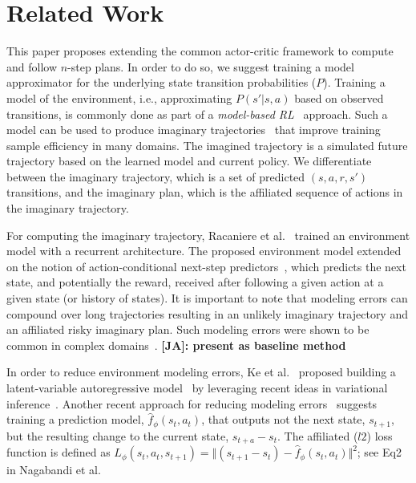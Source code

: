 \documentclass[letterpaper]{article} %
\newcommand{\JA}[1] {{\color{red} \textbf{[JA]: #1}}}
\begin{document}
\section{Related Work}

This paper proposes extending the common actor-critic framework to compute and follow $n$-step plans. In order to do so, we suggest training a model approximator for the underlying state transition probabilities ($P$).   
Training a model of the environment, i.e., approximating $P(s'|s,a)$ based on observed transitions, is commonly done as part of a \textit{model-based RL}~\cite{kaiser2019model,xu2020prediction} approach. Such a model can be used to produce imaginary trajectories~\cite{racaniere2017imagination} that improve training sample efficiency in many domains. The imagined trajectory is a simulated future trajectory based on the learned model and current policy. We differentiate between the imaginary trajectory, which is a set of predicted $(s,a,r,s')$ transitions, and the imaginary plan, which is the affiliated sequence of actions in the imaginary trajectory. 

For computing the imaginary trajectory, Racaniere et al.~\citeyear{racaniere2017imagination} trained an environment model with a recurrent architecture. The proposed environment model extended on the notion of action-conditional next-step predictors~\cite{oh2015action,chiappa2017recurrent,leibfried2017deep}, which predicts the next state, and potentially the reward, received after following a given action at a given state (or history of states).
It is important to note that modeling errors can compound over long trajectories resulting in an unlikely imaginary trajectory and an affiliated risky imaginary plan. Such modeling errors were shown to be common in complex domains~\cite{talvitie2014model,talvitie2015agnostic}. \JA{present as baseline method}

In order to reduce environment modeling errors, Ke et al.~\citeyear{ke2018modeling} proposed building a latent-variable autoregressive model~\cite{gulrajani2016pixelvae} by leveraging recent ideas in variational inference~\cite{zhang2018advances}. Another recent approach for reducing modeling errors~\cite{nagabandi2018neural} suggests training a prediction model, $\hat{f}_\phi(s_t, a_t)$, that outputs not the next state, $s_{t+1}$, but the resulting change to the current state, $s_{t+a}-s_t$. The affiliated ($l2$) loss function is defined as $L_\phi(s_t,a_t,s_{t+1})=\Vert (s_{t+1}-s_t) -  \hat{f}_\phi(s_t, a_t) \Vert ^2$; see Eq2 in Nagabandi et al.
\end{document}
